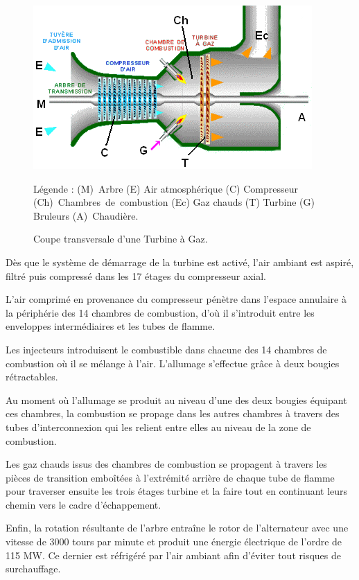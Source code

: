 \begin{figure}[htb]
\centering
\includegraphics[scale=1]{./Figures/coupe_tg.png}
\caption{Coupe transversale d'une Turbine à Gaz.        }
Légende : \hbox{(M) Arbre} (E) Air atmosphérique     (C) Compresseur \hbox{(Ch) Chambres de combustion} (Ec) Gaz chauds  (T) Turbine (G) Bruleurs (A)\hbox{ Chaudière}.
\end{figure}

Dès que le système de démarrage de la turbine est activé, l'air ambiant est aspiré, filtré puis compressé dans les 17 étages du compresseur axial. 
 
L'air comprimé en provenance du compresseur pénètre dans l'espace annulaire à la périphérie des 14 chambres de combustion, d'où il s'introduit entre les enveloppes intermédiaires et les tubes de flamme. 

Les injecteurs introduisent le combustible dans chacune des 14 chambres de combustion où il se mélange à l'air. L'allumage s'effectue grâce à deux bougies rétractables.

Au moment où l'allumage se produit au niveau d'une des deux bougies équipant ces chambres, la combustion se propage dans les autres chambres à travers des tubes d'interconnexion qui les relient entre elles au niveau de la zone de combustion. 

Les gaz chauds issus des chambres de combustion se propagent à travers les pièces de transition emboîtées à l'extrémité arrière de chaque tube de flamme pour traverser ensuite les trois étages turbine et la faire tout en continuant leurs chemin vers le cadre d'échappement. 

Enfin, la rotation résultante de l'arbre entraîne le rotor de l'alternateur avec une vitesse de 3000 tours par minute et produit une énergie électrique de l'ordre de 115 MW. Ce dernier est réfrigéré par l'air ambiant afin d'éviter tout risques de surchauffage.

